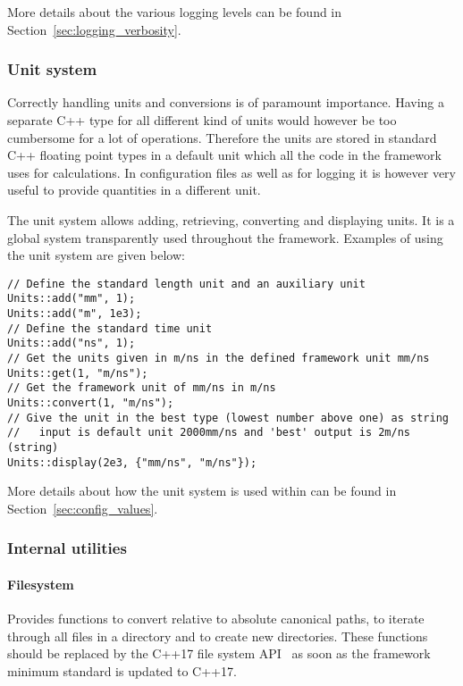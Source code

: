 More details about the various logging levels can be found in Section~\ref{sec:logging_verbosity}.

\subsubsection{Unit system}
\label{sec:unit_system}
Correctly handling units and conversions is of paramount importance.
Having a separate C++ type for all different kind of units would however be too cumbersome for a lot of operations.
Therefore the units are stored in standard C++ floating point types in a default unit which all the code in the framework uses for calculations.
In configuration files as well as for logging it is however very useful to provide quantities in a different unit.

The unit system allows adding, retrieving, converting and displaying units.
It is a global system transparently used throughout the framework.
Examples of using the unit system are given below:
\begin{verbatim}
// Define the standard length unit and an auxiliary unit
Units::add("mm", 1);
Units::add("m", 1e3);
// Define the standard time unit
Units::add("ns", 1);
// Get the units given in m/ns in the defined framework unit mm/ns
Units::get(1, "m/ns");
// Get the framework unit of mm/ns in m/ns
Units::convert(1, "m/ns");
// Give the unit in the best type (lowest number above one) as string
//   input is default unit 2000mm/ns and 'best' output is 2m/ns (string)
Units::display(2e3, {"mm/ns", "m/ns"});
\end{verbatim}

More details about how the unit system is used within \apsq can be found in Section~\ref{sec:config_values}.

\subsubsection{Internal utilities}
\paragraph{Filesystem}
\label{sec:filesystem}
Provides functions to convert relative to absolute canonical paths, to iterate through all files in a directory and to create new directories.
These functions should be replaced by the C++17 file system API~\cite{cppfilesystem} as soon as the framework minimum standard is updated to C++17.

